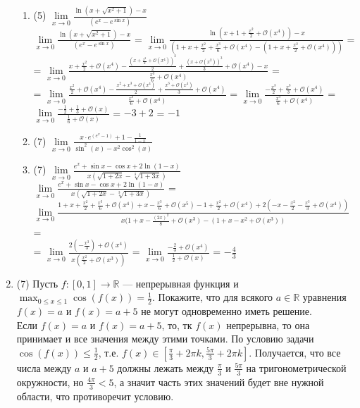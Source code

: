 \documentclass[a4paper]{article}
\begin{document}
\begin{enumerate}
\begin{enumerate}
        \item (5) $\lim\limits_{x\to 0}\frac{\ln (x+\sqrt{x^2+1})-x}{(e^x-e^{\sin x})}$\\
        $\lim\limits_{x\to 0}\frac{\ln (x+\sqrt{x^2+1})-x}{(e^x-e^{\sin x})}$ = 
        $\lim\limits_{x\to 0}\frac{\ln (x + 1 + \frac{x^2}{2} + \mathcal O(x^4))-x}{(1 + x + \frac{x^2}{2} + \frac{x^3}{6} + \mathcal O(x^4) - (1 + x + \frac{x^2}{2} + \mathcal O(x^4)))}$ =\\=
         $\lim\limits_{x\to 0}\frac{x + \frac{x^2}{2} + \mathcal O(x^4)  - \frac{(x + \frac{x^2}{2} + \mathcal O(x^4))^2}{2} + \frac{(x + \mathcal O(x^2))^3}{3} + \mathcal O(x^4)-x}{\frac{x^3}{6} + \mathcal O(x^4)}$ =\\=
         $\lim\limits_{x\to 0}\frac{\frac{x^2}{2} + \mathcal O(x^4)  - \frac{x^2 + x^3 + \mathcal O(x^4)}{2} + \frac{x^3 + \mathcal O(x^4)}{3} + \mathcal O(x^4)}{\frac{x^3}{6} + \mathcal O(x^4)}$ = 
         $\lim\limits_{x\to 0}\frac{-\frac{x^3}{2} + \frac{x^3}{3} + \mathcal O(x^4)}{\frac{x^3}{6} + \mathcal O(x^4)}$ = 
         $\lim\limits_{x\to 0}\frac{-\frac{1}{2} + \frac{1}{3} + \mathcal O(x)}{\frac{1}{6} + \mathcal O(x)}$ = 
         $-3 + 2$ = $-1$
        \item (7) $\lim\limits_{x\to 0}\frac{x\cdot e^{(e^x-1)}+1-\frac{1}{1-x}}{\sin^2(x)-x^2\cos^2(x)}$
        \item (7) $\lim\limits_{x\to 0} \frac{e^x+\sin x - \cos x + 2\ln(1-x)}{x(\sqrt{1+2x}-\sqrt[3]{1+3x})}$\\
        $\lim\limits_{x\to 0} \frac{e^x+\sin x - \cos x + 2\ln(1-x)}{x(\sqrt{1+2x}-\sqrt[3]{1+3x})}$ = $\lim\limits_{x\to 0} \frac{1 + x + \frac{x^2}{2} + \frac{x^3}{6} + \mathcal O(x^4) + x - \frac{x^3}{6} + \mathcal O(x^5) - 1 + \frac{x^2}{2} + \mathcal O(x^4) + 2(-x - \frac{x^2}{2} - \frac{x^3}{3} + \mathcal O(x^4))}{x(1 + x - \frac{(2x)^2}{8} + \mathcal O(x^3) - (1 + x - x^2 + \mathcal O(x^3))}$ =\\=
         $\lim\limits_{x\to 0} \frac{2(-\frac{x^3}{3}) + \mathcal O(x^4) }{x(\frac{x^2}{2} + \mathcal O(x^3))}$ = 
         $\lim\limits_{x\to 0} \frac{-\frac{2}{3} + \mathcal O(x^4) }{\frac{1}{2} + \mathcal O(x)}$ = $-\frac{4}{3}$
    \end{enumerate}
    
    \item (7) Пусть $f:[0,1]\to \mathbb R$ --- непрерывная функция и $\max_{0\leq x\leq 1}\cos (f(x))=\frac{1}{2}$. Покажите, что для всякого $a\in \mathbb R$ уравнения $f(x) = a$ и $f(x) = a + 5$ не могут одновременно иметь решение.\\
    Если $f(x) = a$ и $f(x) = a + 5$, то, тк $f(x)$ непрерывна, то она принимает и все значения между этими точками. По условию задачи $\cos(f(x)) \le \frac{1}{2}$, т.е. $f(x) \in [\frac{\pi}{3} + 2\pi k, \frac{5\pi}{3} + 2\pi k]$. 
    Получается, что все числа между $a$ и $a + 5$ должны лежать между $\frac{\pi}{3}$ и $\frac{5\pi}{3}$ на тригонометрической окружности, но $\frac{4\pi}{3} < 5$, а значит часть этих значений будет вне нужной области, что противоречит условию.


\end{enumerate}
\end{document}

